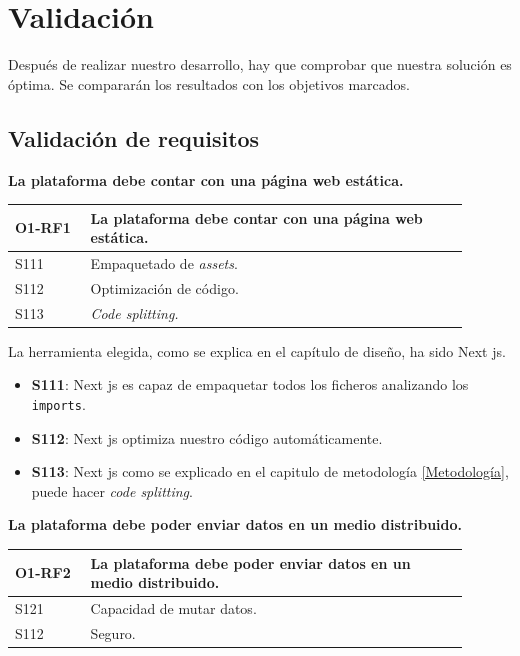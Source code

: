 \section{Validación}
Después de realizar nuestro desarrollo, hay que comprobar que nuestra solución es óptima. Se compararán los resultados con los objetivos marcados.
\subsection{Validación de requisitos}
\textbf{La plataforma debe contar con una página web estática.}
\begin{center}
    \begin{table}[h!]
        \begin{tabular}{|p{0.15\linewidth} | p{0.75\linewidth}|}
            \hline
             
            \textbf{O1-RF1} & \textbf{La plataforma debe contar con una página web estática.} \\
            \hline
            S111            & Empaquetado de \textit{assets}. \\
            \hline
            S112            & Optimización de código. \\
            \hline
            S113            & \textit{Code splitting.} \\
            \hline
        \end{tabular}
    \end{table}
\end{center}
La herramienta elegida, como se explica en el capítulo de diseño, ha sido Next js.
\begin{itemize}
    \item \textbf{S111}: Next js es capaz de empaquetar todos los ficheros analizando los \verb|imports|.
    \item \textbf{S112}: Next js optimiza nuestro código automáticamente.
    \item \textbf{S113}: Next js como se explicado en el capitulo de metodología \ref{Metodología}, puede hacer \textit{code splitting}.
\end{itemize}
\textbf{La plataforma debe poder enviar datos en un medio distribuido.}
\begin{center}
    \begin{table}[h!]
        \begin{tabular}{|p{0.15\linewidth} | p{0.75\linewidth}|}
            \hline
             
            \textbf{O1-RF2} & \textbf{La plataforma debe poder enviar datos en un medio distribuido.} \\
            \hline
            S121            & Capacidad de mutar datos. \\
            \hline
            S112            & Seguro. \\
            \hline
        \end{tabular}
    \end{table}
\end{center}
